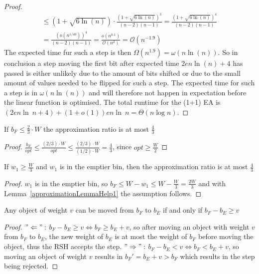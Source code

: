 \begin{proof}
\begin{gather}
        \nonumber \le ({1+\sqrt{6\ln(n)}}) \cdot \frac{{(1+\sqrt{6\ln(n)})}^{3}}{(n-2)(n-1)}
        = \frac{{(1+\sqrt{6\ln(n)})}^{4}}{(n-2)(n-1)}\\ \nonumber
        = \frac{{(o({n}^{1/40}))}^{4}}{(n-2)(n-1)}
        = \frac{o(n^{0.1})}{\mathcal{O}(n^{2})}
        = \mathcal{O}(n^{-1.9})
    \end{gather}
    The expected time fur such a step is then $\Omega(n^{1.9})=\omega(n\ln(n))$.
    So in conclusion a step moving the first bit after expected time $2en\ln(n)+4$ has passed is either unlikely due to the amount of bits shifted or due to the small amount of values needed to be flipped for such a step.
    The expected time for such a step is in $\omega(n\ln(n))$ and will therefore not happen in expectation before the linear function is optimised.
    The total runtime for the (1+1) EA is $(2en\ln~n+4) + (1+o(1))en\ln~n = \Theta(n\log{}n)$.
\end{proof}

\begin{lemma}\label{approximationLemmaHelp1}
    If \(b_F \le \frac{2}{3} \cdot W\) the approximation ratio is at most $\frac{4}{3}$
\end{lemma}
\begin{proof}
    \(\frac{b_F}{opt} \le \frac{(2/3) \cdot W}{opt} \le \frac{(2/3) \cdot W}{(1/2) \cdot W} = \frac{4}{3}\), since \(opt \ge \frac{W}{2}\)
\end{proof}

\begin{corollary}\label{approximationCorollaryHelp2}
    If \(w_1 \ge \frac{W}{3}\) and \(w_1\) is in the emptier bin, then the approximation ratio is at most $\frac{4}{3}$
\end{corollary}
\begin{proof}
    $w_1$ is in the emptier bin, so \( b_F \le W - w_1 \le W - \frac{W}{3} = \frac{2W}{3} \) and with Lemma~\ref{approximationLemmaHelp1} the assumption follows.
\end{proof}

\begin{lemma}\label{movingObjectsLemma}
    Any object of weight $v$ can be moved from $b_F$ to $b_E$ if and only if \(b_F - b_E \ge v\)
\end{lemma}
\begin{proof}
    $"\Leftarrow":$\newline
    \(b_F - b_E \ge v \Leftrightarrow b_F \ge b_E + v\), so after moving an object with weight $v$ from $b_F$ to $b_E$, the new weight of $b_E$ is at most the weight of $b_F$ before moving the object, thus the RSH accepts the step.\newline
    $"\Rightarrow":$\newline
    \(b_F - b_E < v \Leftrightarrow b_F < b_E + v\), so moving an object of weight $v$ results in ${b_F}' = b_E+v > b_F$ which results in the step being rejected.
\end{proof}

